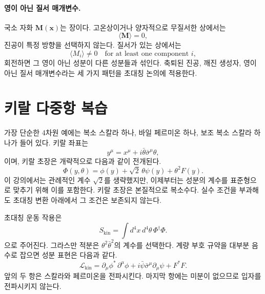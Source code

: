 \paragraph{영이 아닌 질서 매개변수.}
국소 자화 \(\mathbf M(\mathbf x)\)는 장이다. 고온상이거나 양자적으로 무질서한 상에서는
\begin{equation}
\langle\mathbf M\rangle=0,
\end{equation}
진공이 특정 방향을 선택하지 않는다. 질서가 있는 상에서는
\begin{equation}
\langle M_i\rangle\neq0
\quad\text{for at least one component }i,
\label{eq:l9-magnetization-order}
\end{equation}
회전하면 그 영이 아닌 성분이 다른 성분들과 섞인다. 축퇴된 진공, 깨진 생성자, 영이 아닌 질서 매개변수라는 세 가지 패턴을 초대칭 논의에 적용한다.

\section{키랄 다중항 복습}

가장 단순한 4차원 예에는 복소 스칼라 하나, 바일 페르미온 하나, 보조 복소 스칼라 하나가 들어 있다. 키랄 좌표는
\begin{equation}
y^\mu=x^\mu+i\bar\theta\bar\sigma^\mu\theta,
\end{equation}
이며, 키랄 초장은 개략적으로 다음과 같이 전개된다.
\begin{equation}
\Phi(y,\theta)=
\phi(y)+\sqrt2\,\theta\psi(y)+\theta^2F(y).
\label{eq:l9-chiral-expansion}
\end{equation}
이 강의에서는 관례적인 계수 \(\sqrt2\)를 생략했지만, 이제부터는 성분의 계수를 표준형으로 맞추기 위해 이를 포함한다. 키랄 초장은 본질적으로 복소수다. 실수 조건을 부과해도 초대칭 변환 아래에서 그 조건은 보존되지 않는다.

초대칭 운동 작용은
\begin{equation}
S_{\mathrm{kin}}
=
\int d^4x\,d^4\theta\,
\Phi^\dagger\Phi.
\label{eq:l9-kahler-action}
\end{equation}
으로 주어진다. 그라스만 적분은 \(\theta^2\bar\theta^2\)의 계수를 선택한다. 계량 부호 규약을 대부분 음수로 잡으면 성분 표현은 다음과 같다.
\begin{equation}
\mathcal L_{\mathrm{kin}}
=
\partial_\mu\phi^\ast\,\partial^\mu\phi
+i\bar\psi\bar\sigma^\mu\partial_\mu\psi
+F^\ast F.
\label{eq:l9-chiral-kinetic}
\end{equation}
앞의 두 항은 스칼라와 페르미온을 전파시킨다. 마지막 항에는 미분이 없으므로 입자를 전파시키지 않는다.

